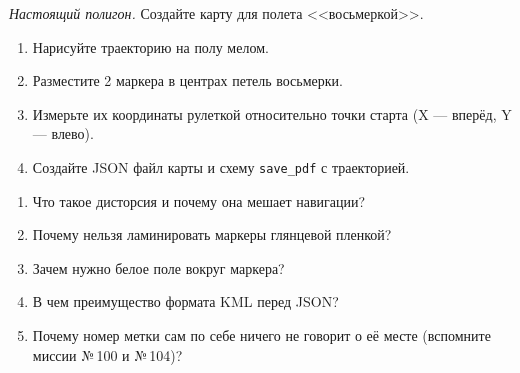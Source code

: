 \begin{taskbox}
\emph{Настоящий полигон.} Создайте карту для полета <<восьмеркой>>.
\begin{enumerate}
    \item Нарисуйте траекторию на полу мелом.
    \item Разместите 2 маркера в центрах петель восьмерки.
    \item Измерьте их координаты рулеткой относительно точки старта (X --- вперёд, Y --- влево).
    \item Создайте JSON файл карты и схему \verb|save_pdf| с траекторией.
\end{enumerate}
\end{taskbox}

\begin{questionbox}
\begin{enumerate}
    \item Что такое дисторсия и почему она мешает навигации?
    \item Почему нельзя ламинировать маркеры глянцевой пленкой?
    \item Зачем нужно белое поле вокруг маркера?
    \item В чем преимущество формата KML перед JSON?
    \item Почему номер метки сам по себе ничего не говорит о её месте (вспомните миссии №\,100 и №\,104)?
\end{enumerate}
\end{questionbox}
